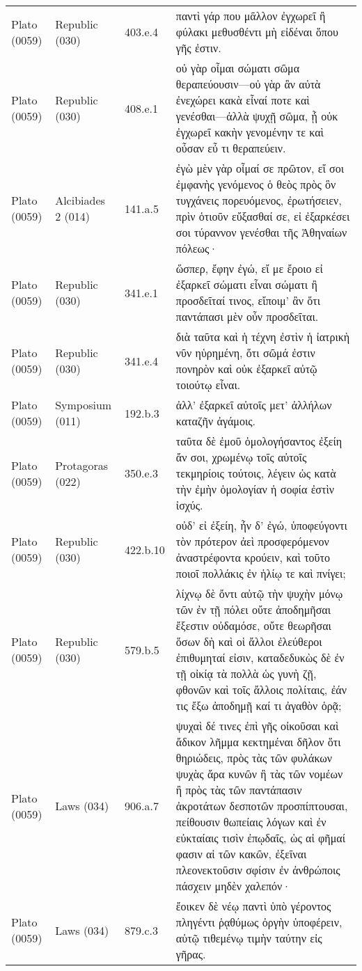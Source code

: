 \begin{longtable}{llll}
Plato (0059) & Republic (030) & 403.e.4 & παντὶ γάρ που μᾶλλον ἐγχωρεῖ ἢ φύλακι μεθυσθέντι μὴ εἰδέναι ὅπου γῆς ἐστιν.\\
Plato (0059) & Republic (030) & 408.e.1 & οὐ γὰρ οἶμαι σώματι σῶμα θεραπεύουσιν—οὐ γὰρ ἂν αὐτὰ ἐνεχώρει κακὰ εἶναί ποτε καὶ γενέσθαι—ἀλλὰ ψυχῇ σῶμα, ᾗ οὐκ ἐγχωρεῖ κακὴν γενομένην τε καὶ οὖσαν εὖ τι θεραπεύειν.\\
Plato (0059) & Alcibiades 2 (014) & 141.a.5 & ἐγὼ μὲν γὰρ οἶμαί σε πρῶτον, εἴ σοι ἐμφανὴς γενόμενος ὁ θεὸς πρὸς ὃν τυγχάνεις πορευόμενος, ἐρωτήσειεν, πρὶν ὁτιοῦν εὔξασθαί σε, εἰ ἐξαρκέσει σοι τύραννον γενέσθαι τῆς Ἀθηναίων πόλεως·\\
\addlinespace
Plato (0059) & Republic (030) & 341.e.1 & ὥσπερ, ἔφην ἐγώ, εἴ με ἔροιο εἰ ἐξαρκεῖ σώματι εἶναι σώματι ἢ προσδεῖταί τινος, εἴποιμ’ ἂν ὅτι παντάπασι μὲν οὖν προσδεῖται.\\
Plato (0059) & Republic (030) & 341.e.4 & διὰ ταῦτα καὶ ἡ τέχνη ἐστὶν ἡ ἰατρικὴ νῦν ηὑρημένη, ὅτι σῶμά ἐστιν πονηρὸν καὶ οὐκ ἐξαρκεῖ αὐτῷ τοιούτῳ εἶναι.\\
Plato (0059) & Symposium (011) & 192.b.3 & ἀλλ’ ἐξαρκεῖ αὐτοῖς μετ’ ἀλλήλων καταζῆν ἀγάμοις.\\
Plato (0059) & Protagoras (022) & 350.e.3 & ταῦτα δὲ ἐμοῦ ὁμολογήσαντος ἐξείη ἄν σοι, χρωμένῳ τοῖς αὐτοῖς τεκμηρίοις τούτοις, λέγειν ὡς κατὰ τὴν ἐμὴν ὁμολογίαν ἡ σοφία ἐστὶν ἰσχύς.\\
Plato (0059) & Republic (030) & 422.b.10 & οὐδ’ εἰ ἐξείη, ἦν δ’ ἐγώ, ὑποφεύγοντι τὸν πρότερον ἀεὶ προσφερόμενον ἀναστρέφοντα κρούειν, καὶ τοῦτο ποιοῖ πολλάκις ἐν ἡλίῳ τε καὶ πνίγει;\\
\addlinespace
Plato (0059) & Republic (030) & 579.b.5 & λίχνῳ δὲ ὄντι αὐτῷ τὴν ψυχὴν μόνῳ τῶν ἐν τῇ πόλει οὔτε ἀποδημῆσαι ἔξεστιν οὐδαμόσε, οὔτε θεωρῆσαι ὅσων δὴ καὶ οἱ ἄλλοι ἐλεύθεροι ἐπιθυμηταί εἰσιν, καταδεδυκὼς δὲ ἐν τῇ οἰκίᾳ τὰ πολλὰ ὡς γυνὴ ζῇ, φθονῶν καὶ τοῖς ἄλλοις πολίταις, ἐάν τις ἔξω ἀποδημῇ καί τι ἀγαθὸν ὁρᾷ;\\
Plato (0059) & Laws (034) & 906.a.7 & ψυχαὶ δέ τινες ἐπὶ γῆς οἰκοῦσαι καὶ ἄδικον λῆμμα κεκτημέναι δῆλον ὅτι θηριώδεις, πρὸς τὰς τῶν φυλάκων ψυχὰς ἄρα κυνῶν ἢ τὰς τῶν νομέων ἢ πρὸς τὰς τῶν παντάπασιν ἀκροτάτων δεσποτῶν προσπίπτουσαι, πείθουσιν θωπείαις λόγων καὶ ἐν εὐκταίαις τισὶν ἐπῳδαῖς, ὡς αἱ φῆμαί φασιν αἱ τῶν κακῶν, ἐξεῖναι πλεονεκτοῦσιν σφίσιν ἐν ἀνθρώποις πάσχειν μηδὲν χαλεπόν·\\
Plato (0059) & Laws (034) & 879.c.3 & ἔοικεν δὲ νέῳ παντὶ ὑπὸ γέροντος πληγέντι ῥᾳθύμως ὀργὴν ὑποφέρειν, αὑτῷ τιθεμένῳ τιμὴν ταύτην εἰς γῆρας.\\

\end{longtable}

